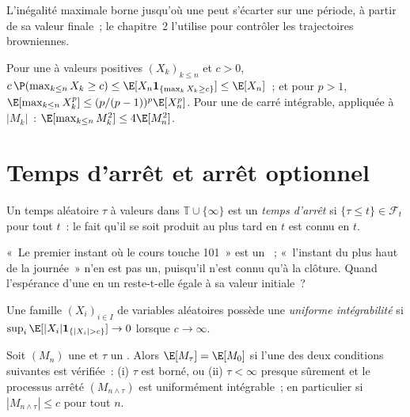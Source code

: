 L'inégalité maximale borne jusqu'où une  peut s'écarter sur une période, à partir de sa valeur finale~;
le chapitre~2 l'utilise pour contrôler les trajectoires browniennes.

\begin{proposition}\label{prop:qm:probability-at-speed:doob}
Pour une  à valeurs positives $(X_k)_{k \le n}$ et $c > 0$, $c\,\P(\max_{k\le n}X_k \ge c)
\le \E[X_n\mathbf 1_{\{\max_k X_k \ge c\}}] \le \E[X_n]$~; et pour $p > 1$, $\E[\max_{k \le
n}X_k^p] \le (p/(p-1))^p\E[X_n^p]$. Pour une  de carré intégrable, appliquée à $|M_k|$~:
$\E[\max_{k\le n}M_k^2] \le 4\E[M_n^2]$.
\end{proposition}

\admitted

\section{Temps d'arrêt et arrêt optionnel}

\begin{definition}\label{def:qm:probability-at-speed:stopping}
Un temps aléatoire $\tau$ à valeurs dans $\mathbb T \cup \{\infty\}$ est un \emph{temps
d'arrêt} si $\{\tau \le t\} \in \mathcal F_t$ pour tout $t$~: le fait
qu'il se soit produit au plus tard en $t$ est connu en $t$.
\end{definition}

«~Le premier instant où le cours touche 101~» est un ~; «~l'instant du plus haut de la journée~»
n'en est pas un, puisqu'il n'est connu qu'à la clôture. Quand l'espérance d'une  en un
 reste-t-elle égale à sa valeur initiale~?

\begin{definition}\label{def:qm:probability-at-speed:ui}
Une famille $(X_i)_{i \in I}$ de variables aléatoires possède une \emph{uniforme
intégrabilité} si $\sup_{i}\E[|X_i|\mathbf 1_{\{|X_i| > c\}}]
\to 0$ lorsque $c \to \infty$.
\end{definition}

\begin{theorem}\label{thm:qm:probability-at-speed:optional}
Soit $(M_n)$ une  et $\tau$ un . Alors $\E[M_\tau] = \E[M_0]$ si l'une des deux conditions suivantes est vérifiée~:
(i) $\tau$ est borné, ou (ii) $\tau < \infty$ presque sûrement et le processus arrêté
$(M_{n \wedge \tau})$ est uniformément intégrable~; en particulier si $|M_{n\wedge\tau}| \le c$ pour
tout $n$.
\end{theorem}

